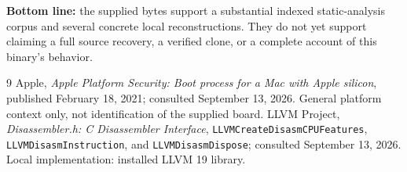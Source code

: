 \documentclass[11pt]{article}
\begin{document}
\textbf{Bottom line:} the supplied bytes support a substantial indexed
static-analysis corpus and several concrete local reconstructions. They do
not yet support claiming a full source recovery, a verified clone, or a
complete account of this binary's behavior.

\begin{thebibliography}{9}
 Apple, \emph{Apple Platform Security: Boot process for a Mac
with Apple silicon}, published February 18, 2021; consulted September 13,
2026. General platform context only, not identification of the supplied board.
 LLVM Project, \emph{Disassembler.h: C Disassembler Interface},
\texttt{LLVMCreateDisasmCPUFeatures}, \texttt{LLVMDisasmInstruction}, and
\texttt{LLVMDisasmDispose}; consulted September 13, 2026. Local implementation:
installed LLVM 19 library.
\end{thebibliography}
\end{document}
